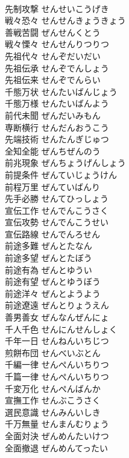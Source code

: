 \documentclass[8pt]{extreport}
\begin{document}
\begin{CJK}{UTF8}{min}
\\	先制攻撃	せんせいこうげき	
\\	戦々恐々	せんせんきょうきょう	
\\	善戦苦闘	ぜんせんくとう	
\\	戦々慄々	せんせんりつりつ	
\\	先祖代々	せんぞだいだい	
\\	先祖伝承	せんぞでんしょう	
\\	先祖伝来	せんぞでんらい	
\\	千態万状	せんたいばんじょう	
\\	千態万様	せんたいばんよう	
\\	前代未聞	ぜんだいみもん	
\\	専断横行	せんだんおうこう	
\\	先端技術	せんたんぎじゅつ	
\\	全知全能	ぜんちぜんのう	
\\	前兆現象	ぜんちょうげんしょう	
\\	前提条件	ぜんていじょうけん	
\\	前程万里	ぜんていばんり	
\\	先手必勝	せんてひっしょう	
\\	宣伝工作	せんでんこうさく	
\\	宣伝攻勢	せんでんこうせい	
\\	宣伝路線	せんでんろせん	
\\	前途多難	ぜんとたなん	
\\	前途多望	ぜんとたぼう	
\\	前途有為	ぜんとゆうい	
\\	前途有望	ぜんとゆうぼう	
\\	前途洋々	ぜんとようよう	
\\	前途遼遠	ぜんとりょうえん	
\\	善男善女	ぜんなんぜんにょ	
\\	千人千色	せんにんせんしょく	
\\	千年一日	せんねんいちじつ	
\\	煎餅布団	せんべいぶとん	
\\	千編一律	せんぺんいちりつ	
\\	千篇一律	せんぺんいちりつ	
\\	千変万化	せんぺんばんか	
\\	宣撫工作	せんぶこうさく	
\\	選民意識	せんみんいしき	
\\	千万無量	せんまんむりょう	
\\	全面対決	ぜんめんたいけつ	
\\	全面撤退	ぜんめんてったい	

\end{CJK}
\end{document}

